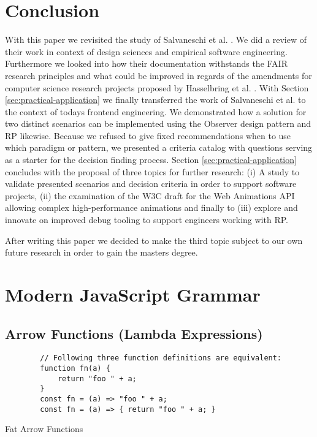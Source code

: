 \documentclass[12pt,a4paper]{article}
\begin{document}
\section{Conclusion}

With this paper we revisited the study of Salvaneschi et al. \cite{7827078}. We did a review of their work in context of design sciences and empirical software engineering. Furthermore we looked into how their documentation withstands the FAIR research principles and what could be improved in regards of the amendments for computer science research projects proposed by Hasselbring et al. \cite{2019arXiv190805986H}. With Section \ref{sec:practical-application} we finally transferred the work of Salvaneschi et al. to the context of todays frontend engineering. We demonstrated how a solution for two distinct scenarios can be implemented using the Observer design pattern and RP likewise. Because we refused to give fixed recommendations when to use which paradigm or pattern, we presented a criteria catalog with questions serving as a starter for the decision finding process. Section \ref{sec:practical-application} concludes with the proposal of three topics for further research: (i) A study to validate presented scenarios and decision criteria in order to support software projects, (ii) the examination of the W3C draft for the Web Animations API allowing complex high-performance animations and finally to (iii) explore and innovate on improved debug tooling to support engineers working with RP.

After writing this paper we decided to make the third topic subject to our own future research in order to gain the masters degree.


\pagebreak

\appendix

\section{Modern JavaScript Grammar}
\label{sec:modern-javascript-grammar}

\subsection{Arrow Functions (Lambda Expressions)}
\begin{listing}[H]
	\begin{verbatim}
		// Following three function definitions are equivalent:
		function fn(a) {
			return "foo " + a;
		}
		const fn = (a) => "foo " + a;
		const fn = (a) => { return "foo " + a; }
	\end{verbatim}
	\caption{Fat Arrow Functions}
\end{listing}
\end{document}
